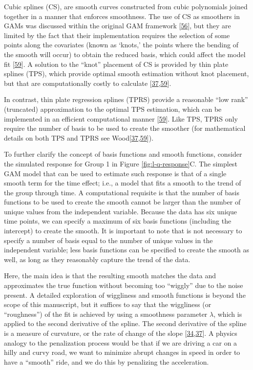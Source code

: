 \documentclass[
]{article}
\begin{document}
Cubic splines (CS), are smooth curves constructed from cubic polynomials joined together in a manner that enforces smoothness. The use of CS as smoothers in GAMs was discussed within the original GAM framework {[}\protect\hyperlink{ref-hastie1987}{56}{]}, but they are limited by the fact that their implementation requires the selection of some points along the covariates (known as `knots,' the points where the bending of the smooth will occur) to obtain the reduced basis, which could affect the model fit {[}\protect\hyperlink{ref-wood2003}{59}{]}. A solution to the ``knot'' placement of CS is provided by thin plate splines (TPS), which provide optimal smooth estimation without knot placement, but that are computationally costly to calculate {[}\protect\hyperlink{ref-wood2017}{37},\protect\hyperlink{ref-wood2003}{59}{]}.

In contrast, thin plate regression splines (TPRS) provide a reasonable ``low rank'' (truncated) approximation to the optimal TPS estimation, which can be implemented in an efficient computational manner {[}\protect\hyperlink{ref-wood2003}{59}{]}. Like TPS, TPRS only require the number of basis to be used to create the smoother (for mathematical details on both TPS and TPRS see Wood{[}\protect\hyperlink{ref-wood2017}{37},\protect\hyperlink{ref-wood2003}{59}{]}).

To further clarify the concept of basis functions and smooth functions, consider the simulated response for Group 1 in Figure \ref{fig:l-q-response}C. The simplest GAM model that can be used to estimate such response is that of a single smooth term for the time effect; i.e., a model that fits a smooth to the trend of the group through time. A computational requisite is that the number of basis functions to be used to create the smooth cannot be larger than the number of unique values from the independent variable. Because the data has six unique time points, we can specify a maximum of six basis functions (including the intercept) to create the smooth. It is important to note that is not necessary to specify a number of basis equal to the number of unique values in the independent variable; less basis functions can be specified to create the smooth as well, as long as they reasonably capture the trend of the data.

Here, the main idea is that the resulting smooth matches the data and approximates the true function without becoming too ``wiggly'' due to the noise present. A detailed exploration of wiggliness and smooth functions is beyond the scope of this manuscript, but it suffices to say that the wiggliness (or ``roughness'') of the fit is achieved by using a smoothness parameter \(\lambda\), which is applied to the second derivative of the spline. The second derivative of the spline is a measure of curvature, or the rate of change of the slope {[}\protect\hyperlink{ref-simpson2018}{34},\protect\hyperlink{ref-wood2017}{37}{]}. A physics analogy to the penalization process would be that if we are driving a car on a hilly and curvy road, we want to minimize abrupt changes in speed in order to have a ``smooth'' ride, and we do this by penalizing the acceleration.
\end{document}
